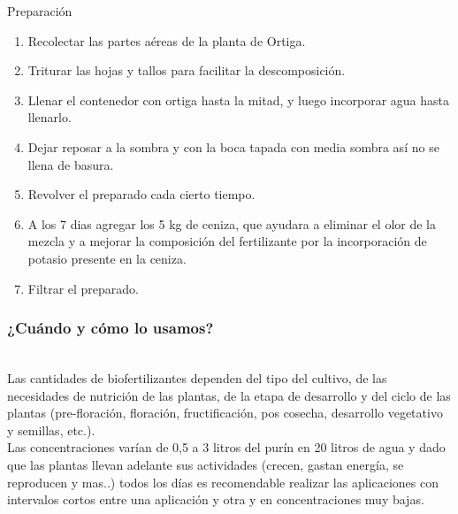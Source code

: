 \documentclass[../main.tex]{subfiles}
\begin{document}
Preparación\\
\begin{enumerate}
    \item Recolectar las partes aéreas de la planta de Ortiga.
    \item Triturar las hojas y tallos para facilitar la descomposición. 
    \item Llenar el contenedor con ortiga hasta la mitad, y luego incorporar agua hasta llenarlo.
    \item Dejar reposar a la sombra y con la boca tapada con media sombra así no se llena de basura. 
    \item Revolver el preparado cada cierto tiempo.
    \item A los 7 dias agregar los 5 kg de ceniza, que ayudara a eliminar el olor de la mezcla y a mejorar la composición del fertilizante por la incorporación de potasio presente en la ceniza.
    \item Filtrar el preparado.
\end{enumerate}

\subsubsection{¿Cuándo y cómo lo usamos?}

\begin{table}[H]
    \centering\sffamily
    {%
    \def\arraystretch{1.5}%
    \caption*{\sffamily\color{CompostGreen!50!black}Usos según el tiempo de fermentación}
    }
    \label{purinortiga1}
\end{table}%
\hfill\\
Las cantidades de biofertilizantes dependen del tipo del cultivo, de las necesidades de nutrición de las plantas, de la etapa de desarrollo y del ciclo de las plantas (pre-floración, floración, fructificación, pos cosecha, desarrollo vegetativo y semillas, etc.).\\
Las concentraciones varían de 0,5 a 3 litros del purín en 20 litros de agua y dado que las plantas llevan adelante sus actividades (crecen, gastan energía, se reproducen y mas..) todos los días es recomendable realizar las aplicaciones con intervalos  cortos entre una aplicación y otra y en concentraciones muy bajas. \\
\end{document}
